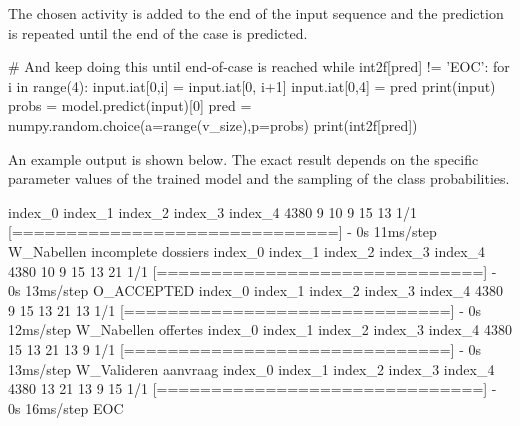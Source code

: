 The chosen activity is added to the end of the input sequence and the prediction is repeated until the end of the case is predicted.

\begin{samepage}
\begin{pythoncode}
# And keep doing this until end-of-case is reached
while int2f[pred] != 'EOC':
    for i in range(4):
        input.iat[0,i] = input.iat[0, i+1]
    input.iat[0,4] = pred
    print(input)
    probs = model.predict(input)[0]
    pred = numpy.random.choice(a=range(v_size),p=probs)
    print(int2f[pred])
\end{pythoncode}
\end{samepage}

An example output is shown below. The exact result depends on the specific parameter values of the trained model and the sampling of the class probabilities.

\begin{samepage}
\begin{textcode}
      index_0  index_1  index_2  index_3  index_4
4380        9       10        9       15       13
1/1 [==============================] - 0s 11ms/step
W_Nabellen incomplete dossiers
      index_0  index_1  index_2  index_3  index_4
4380       10        9       15       13       21
1/1 [==============================] - 0s 13ms/step
O_ACCEPTED
      index_0  index_1  index_2  index_3  index_4
4380        9       15       13       21       13
1/1 [==============================] - 0s 12ms/step
W_Nabellen offertes
      index_0  index_1  index_2  index_3  index_4
4380       15       13       21       13        9
1/1 [==============================] - 0s 13ms/step
W_Valideren aanvraag
      index_0  index_1  index_2  index_3  index_4
4380       13       21       13        9       15
1/1 [==============================] - 0s 16ms/step
EOC
\end{textcode}
\end{samepage}


